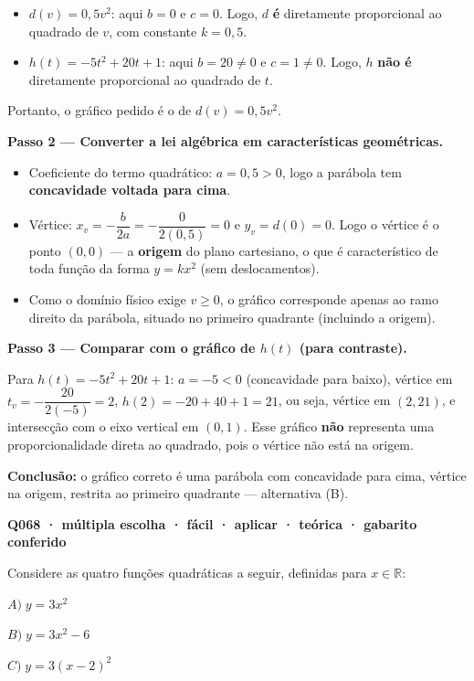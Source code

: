 \documentclass[11pt,a4paper]{article}
\begin{document}
\begin{itemize}[nosep,leftmargin=*]
\item $d(v) = 0{,}5v^2$: aqui $b=0$ e $c=0$. Logo, $d$ \textbf{é} diretamente proporcional ao quadrado de $v$, com constante $k=0{,}5$.
\item $h(t) = -5t^2+20t+1$: aqui $b=20\neq0$ e $c=1\neq0$. Logo, $h$ \textbf{não é} diretamente proporcional ao quadrado de $t$.
\end{itemize}

Portanto, o gráfico pedido é o de $d(v)=0{,}5v^2$.

\textbf{Passo 2 — Converter a lei algébrica em características geométricas.}

\begin{itemize}[nosep,leftmargin=*]
\item Coeficiente do termo quadrático: $a=0{,}5>0$, logo a parábola tem \textbf{concavidade voltada para cima}.
\item Vértice: $x_v = -\dfrac{b}{2a} = -\dfrac{0}{2(0{,}5)} = 0$ e $y_v = d(0) = 0$. Logo o vértice é o ponto $(0,0)$ — a \textbf{origem} do plano cartesiano, o que é característico de toda função da forma $y=kx^2$ (sem deslocamentos).
\item Como o domínio físico exige $v\geq 0$, o gráfico corresponde apenas ao ramo direito da parábola, situado no primeiro quadrante (incluindo a origem).
\end{itemize}

\textbf{Passo 3 — Comparar com o gráfico de $h(t)$ (para contraste).}

Para $h(t)=-5t^2+20t+1$: $a=-5<0$ (concavidade para baixo), vértice em $t_v = -\dfrac{20}{2(-5)} = 2$, $h(2) = -20+40+1 = 21$, ou seja, vértice em $(2,21)$, e intersecção com o eixo vertical em $(0,1)$. Esse gráfico \textbf{não} representa uma proporcionalidade direta ao quadrado, pois o vértice não está na origem.

\textbf{Conclusão:} o gráfico correto é uma parábola com concavidade para cima, vértice na origem, restrita ao primeiro quadrante — alternativa (B).

\bigskip\noindent\textbf{Q068 · múltipla escolha · fácil · aplicar · teórica · gabarito conferido}\par\nopagebreak
Considere as quatro funções quadráticas a seguir, definidas para $x \in \mathbb{R}$:

$A) \; y = 3x^2$

$B) \; y = 3x^2 - 6$

$C) \; y = 3(x-2)^2$
\end{document}
